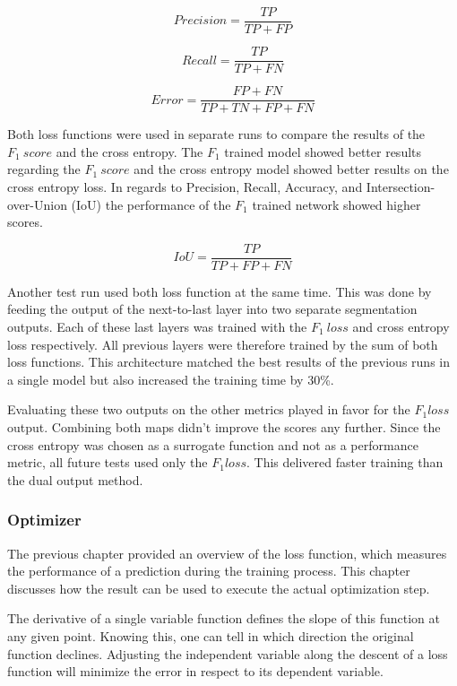 \begin{equation}
Precision = \frac{TP}{TP+FP}
\end{equation}

\begin{equation}
Recall = \frac{TP}{TP+FN}
\end{equation}

\begin{equation}
Error = \frac{FP+FN}{TP+TN+FP+FN}
\end{equation}

Both loss functions were used in separate runs to compare the results of the $F_1 \ score$ and the cross entropy. The $F_1$ trained model showed better results regarding the $F_1 \ score$ and the cross entropy model showed better results on the cross entropy loss. In regards to Precision, Recall, Accuracy, and Intersection-over-Union (IoU) the performance of the $F_1$ trained network showed higher scores.

\begin{equation}
IoU= \frac{TP}{TP+FP+FN}
\end{equation}

Another test run used both loss function at the same time. This was done by feeding the output of the next-to-last layer into two separate segmentation outputs. Each of these last layers was trained with the $F_1 \ loss$ and cross entropy loss respectively. All previous layers were therefore trained by the sum of both loss functions. This architecture matched the best results of the previous runs in a single model but also increased the training time by 30\%.

Evaluating these two outputs on the other metrics played in favor for the $F_1 loss$ output. Combining both maps didn't improve the scores any further. Since the cross entropy was chosen as a surrogate function and not as a performance metric, all future tests used only the $F_1 loss$. This delivered faster training than the dual output method.

\subsubsection{Optimizer}

The previous chapter provided an overview of the loss function, which measures the performance of a prediction during the training process. This chapter discusses how the result can be used to execute the actual optimization step.

The derivative of a single variable function defines the slope of this function at any given point. Knowing this, one can tell in which direction the original function declines. Adjusting the independent variable along the descent of a loss function will minimize the error in respect to its dependent variable.

